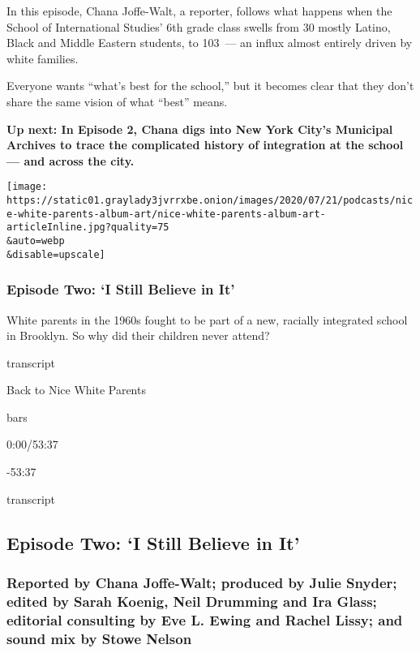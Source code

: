 In this episode, Chana Joffe-Walt, a reporter, follows what happens when
the School of International Studies' 6th grade class swells from 30
mostly Latino, Black and Middle Eastern students, to 103~--- an influx
almost entirely driven by white families.

Everyone wants ``what's best for the school,'' but it becomes clear that
they don't share the same vision of what ``best'' means.

\textbf{Up next: In Episode 2, Chana digs into New York City's Municipal
Archives to trace the complicated history of integration at the school
--- and across the city.}

\texttt{[image: https://static01.graylady3jvrrxbe.onion/images/2020/07/21/podcasts/nice-white-parents-album-art/nice-white-parents-album-art-articleInline.jpg?quality=75\\\&auto=webp\\\&disable=upscale]}

\hypertarget{episode-two-i-still-believe-in-it}{%
\subsubsection{Episode Two: `I Still Believe in
It'}\label{episode-two-i-still-believe-in-it}}

White parents in the 1960s fought to be part of a new, racially
integrated school in Brooklyn. So why did their children never attend?

transcript

Back to Nice White Parents

bars

0:00/53:37

-53:37

transcript

\hypertarget{episode-two-i-still-believe-in-it-1}{%
\subsection{Episode Two: `I Still Believe in
It'}\label{episode-two-i-still-believe-in-it-1}}

\hypertarget{reported-by-chana-joffe-walt-produced-by-julie-snyder-edited-by-sarah-koenig-neil-drumming-and-ira-glass-editorial-consulting-by-eve-l-ewing-and-rachel-lissy-and-sound-mix-by-stowe-nelson-2}{%
\subsubsection{Reported by Chana Joffe-Walt; produced by Julie Snyder;
edited by Sarah Koenig, Neil Drumming and Ira Glass; editorial
consulting by Eve L. Ewing and Rachel Lissy; and sound mix by Stowe
Nelson}\label{reported-by-chana-joffe-walt-produced-by-julie-snyder-edited-by-sarah-koenig-neil-drumming-and-ira-glass-editorial-consulting-by-eve-l-ewing-and-rachel-lissy-and-sound-mix-by-stowe-nelson-2}}

